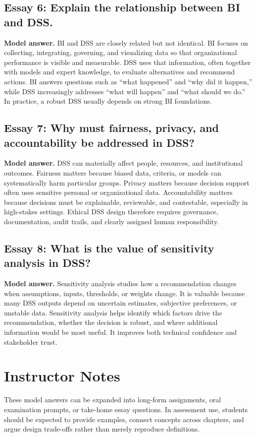 \subsection*{Essay 6: Explain the relationship between BI and DSS.}
\textbf{Model answer.}
BI and DSS are closely related but not identical. BI focuses on collecting,
integrating, governing, and visualizing data so that organizational performance
is visible and measurable. DSS uses that information, often together with
models and expert knowledge, to evaluate alternatives and recommend actions.
BI answers questions such as ``what happened'' and ``why did it happen,'' while
DSS increasingly addresses ``what will happen'' and ``what should we do.'' In
practice, a robust DSS usually depends on strong BI foundations.

\subsection*{Essay 7: Why must fairness, privacy, and accountability be addressed in DSS?}
\textbf{Model answer.}
DSS can materially affect people, resources, and institutional outcomes.
Fairness matters because biased data, criteria, or models can systematically
harm particular groups. Privacy matters because decision support often uses
sensitive personal or organizational data. Accountability matters because
decisions must be explainable, reviewable, and contestable, especially in
high-stakes settings. Ethical DSS design therefore requires governance,
documentation, audit trails, and clearly assigned human responsibility.

\subsection*{Essay 8: What is the value of sensitivity analysis in DSS?}
\textbf{Model answer.}
Sensitivity analysis studies how a recommendation changes when assumptions,
inputs, thresholds, or weights change. It is valuable because many DSS outputs
depend on uncertain estimates, subjective preferences, or unstable data.
Sensitivity analysis helps identify which factors drive the recommendation,
whether the decision is robust, and where additional information would be most
useful. It improves both technical confidence and stakeholder trust.

\section{Instructor Notes}

These model answers can be expanded into long-form assignments, oral
examination prompts, or take-home essay questions. In assessment use, students
should be expected to provide examples, connect concepts across chapters, and
argue design trade-offs rather than merely reproduce definitions.
